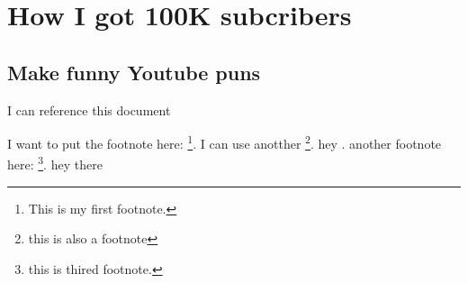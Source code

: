\chapter{How I got 100K subcribers}

\section{Make funny Youtube puns}

I can reference this document \cite{Emerson2001-gz}

I want to put the footnote here: \footnote{This is my first footnote.}. I can use anotther \footnote[42]{this is also a footnote}. hey \footnotemark. another footnote here: \footnote[3]{this is thired footnote.}. hey there \footnotemark


